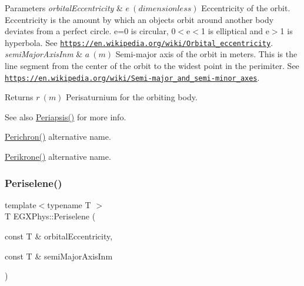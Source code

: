 \begin{DoxyParams}{Parameters}
{\em orbital\+Eccentricity} & $ e\ (dimensionless)$ Eccentricity of the orbit. Eccentricity is the amount by which an objects orbit around another body deviates from a perfect circle. e=0 is circular, 0$<$e$<$1 is elliptical and e$>$1 is hyperbola. See \href{https://en.wikipedia.org/wiki/Orbital_eccentricity}{\tt https\+://en.\+wikipedia.\+org/wiki/\+Orbital\+\_\+eccentricity}. \\
\hline
{\em semi\+Major\+Axis\+Inm} & $ a\ (m)$ Semi-\/major axis of the orbit in meters. This is the line segment from the center of the orbit to the widest point in the perimiter. See \href{https://en.wikipedia.org/wiki/Semi-major_and_semi-minor_axes}{\tt https\+://en.\+wikipedia.\+org/wiki/\+Semi-\/major\+\_\+and\+\_\+semi-\/minor\+\_\+axes}. \\
\hline
\end{DoxyParams}
\begin{DoxyReturn}{Returns}
$ r\ (m)$ Perisaturnium for the orbiting body. 
\end{DoxyReturn}
\begin{DoxySeeAlso}{See also}
\mbox{\hyperlink{group___e_g_x_phys-_periapsis_gad487212733711bc2ce73c8137c9309c3}{Periapsis()}} for more info. 

\mbox{\hyperlink{group___e_g_x_phys-_periapsis_gae8dfb0b7ebcd117ba94f2d1a7b2e13ad}{Perichron()}} alternative name. 

\mbox{\hyperlink{group___e_g_x_phys-_periapsis_ga6b7ae332e74a35cd2c116b4a58204f4b}{Perikrone()}} alternative name. 
\end{DoxySeeAlso}
\mbox{\label{group___e_g_x_phys-_periapsis_ga91c6e1f3b6f98fe053bec87efcff4364}} 
\subsubsection{\texorpdfstring{Periselene()}{Periselene()}}
{\footnotesize\ttfamily template$<$typename T $>$ \\
T E\+G\+X\+Phys\+::\+Periselene (\begin{DoxyParamCaption}\item[{const T \&}]{orbital\+Eccentricity,  }\item[{const T \&}]{semi\+Major\+Axis\+Inm }\end{DoxyParamCaption})}



